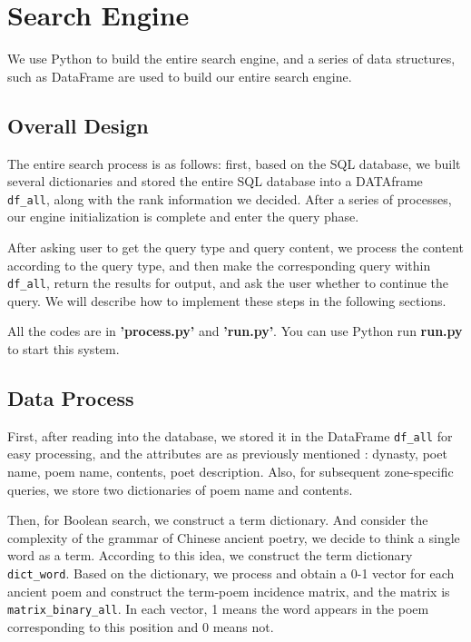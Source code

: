 \section{Search Engine} \label{sec:search}

We use Python to build the entire search engine, and a series of data structures, such as DataFrame are used to build our entire search engine.

\subsection{Overall Design}

The entire search process is as follows: first, based on the SQL database, we built several dictionaries and stored the entire SQL database into a DATAframe \lstinline{df_all}, along with the rank information we decided. After a series of processes, our engine initialization is complete and enter the query phase.

After asking user to get the query type and query content, we process the content according to the query type, and then make the corresponding query within \lstinline{df_all}, return the results for output, and ask the user whether to continue the query. We will describe how to implement these steps in the following sections.

All the codes are in\textbf{ 'process.py'} and \textbf{'run.py'}. You can use Python run \textbf{run.py} to start this system.

\subsection{Data Process}

First, after reading into the database, we stored it in the DataFrame \lstinline{df_all} for easy processing, and the attributes are as previously mentioned : dynasty, poet name, poem name, contents, poet description. Also, for subsequent zone-specific queries, we store two dictionaries of poem name and contents.

Then, for Boolean search, we construct a term dictionary. And consider the complexity of the grammar of Chinese ancient poetry, we decide to think a single word as a term. According to this idea, we construct the term dictionary \lstinline{dict_word}. Based on the dictionary, we process and obtain a 0-1 vector for each ancient poem and construct the term-poem incidence matrix, and the matrix is  \lstinline{matrix_binary_all}. In each vector, 1 means the word  appears in the poem corresponding to this position and 0 means not.

